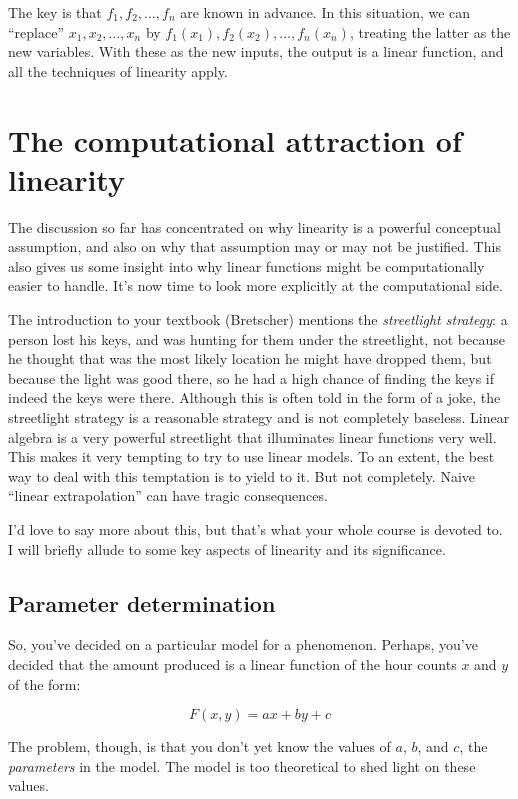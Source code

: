 \documentclass[10pt]{amsart}
\begin{document}
The key is that $f_1,f_2,\dots,f_n$ are known in advance. In this
situation, we can ``replace'' $x_1,x_2,\dots,x_n$ by
$f_1(x_1),f_2(x_2),\dots,f_n(x_n)$, treating the latter as the new
variables. With these as the new inputs, the output is a linear
function, and all the techniques of linearity apply.

\section{The computational attraction of linearity}

The discussion so far has concentrated on why linearity is a powerful
conceptual assumption, and also on why that assumption may or may not
be justified. This also gives us some insight into why linear
functions might be computationally easier to handle. It's now time to
look more explicitly at the computational side.

The introduction to your textbook (Bretscher) mentions the {\em
  streetlight strategy}: a person lost his keys, and was hunting for
them under the streetlight, not because he thought that was the most
likely location he might have dropped them, but because the light was
good there, so he had a high chance of finding the keys if indeed the
keys were there. Although this is often told in the form of a joke,
the streetlight strategy is a reasonable strategy and is not
completely baseless. Linear algebra is a very powerful streetlight
that illuminates linear functions very well. This makes it very
tempting to try to use linear models. To an extent, the best way to
deal with this temptation is to yield to it. But not completely. Naive
``linear extrapolation'' can have tragic consequences.

I'd love to say more about this, but that's what your whole course is
devoted to. I will briefly allude to some key aspects of linearity and
its significance.

\subsection{Parameter determination}

So, you've decided on a particular model for a phenomenon. Perhaps,
you've decided that the amount produced is a linear function of the hour
counts $x$ and $y$ of the form:

$$F(x,y) = ax + by + c$$

The problem, though, is that you don't yet know the values of $a$,
$b$, and $c$, the {\em parameters} in the model. The model is too
theoretical to shed light on these values.
\end{document}
